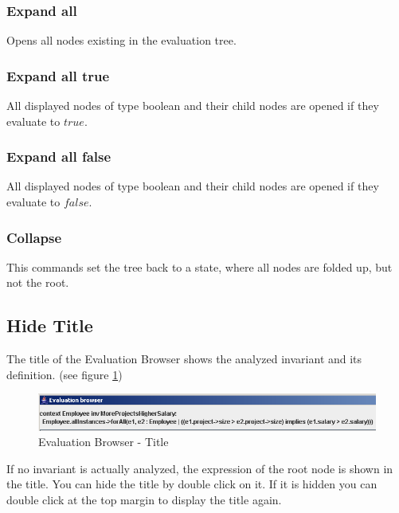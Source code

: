 \documentclass[a4paper,titlepage,oneside,final]{scrreprt} %
\begin{document}
\subsubsection{Expand all}
Opens all nodes existing in the evaluation tree.
\subsubsection{Expand all true}
All displayed nodes of type boolean and their child nodes are opened if they evaluate to $\mathit{true}$.
\subsubsection{Expand all false}
All displayed nodes of type boolean and their child nodes are opened if they evaluate to $\mathit{false}$.
\subsubsection{Collapse}
This commands set the tree back to a state, where all nodes are folded up, but not the root.
\subsection{Hide Title}
The title of the Evaluation Browser shows the analyzed invariant and its definition. (see
figure \ref{fig:EvaluationBrowserTitle})
\begin{figure}[ht]
\centering
\includegraphics[scale=0.5]{Screenshots/GUI/EvaluationBrowserTitle.png}
\caption{Evaluation Browser - Title}
\label{fig:EvaluationBrowserTitle}
\end{figure}
If no invariant is actually analyzed, the expression of the root node is shown in the title.
You can hide the title by double click on it. If it is hidden you can double click at the top margin
to display the title again.
\end{document}

